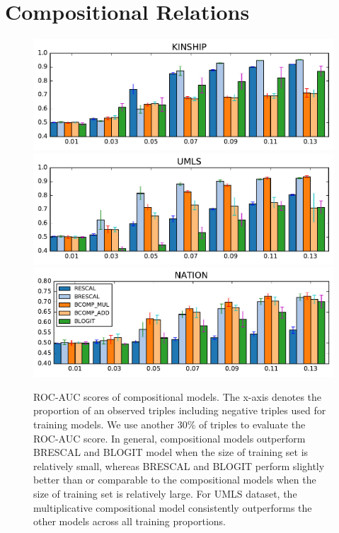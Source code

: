 \documentclass{article}
\begin{document}
\section{Compositional Relations}

\begin{figure}[t]
	\centering
	\includegraphics[width=\linewidth]{images/comp_training_error_kinship_small.pdf}
	\includegraphics[width=\linewidth]{images/comp_training_error_umls_small.pdf}			
	\includegraphics[width=\linewidth]{images/comp_training_error_nation_small.pdf}				
	\caption{\label{fig:r_vs_br} ROC-AUC scores of compositional models. The x-axis denotes the proportion of an observed triples including negative triples used for training models. We  use another 30\% of triples to evaluate the ROC-AUC score. In general, compositional models outperform BRESCAL and BLOGIT model when the size of training set is relatively small, whereas BRESCAL and BLOGIT perform slightly better than or comparable to the compositional models when the size of training set is relatively large. For UMLS dataset, the multiplicative compositional model consistently outperforms the other models across all training proportions.}
\end{figure}
\end{document}
